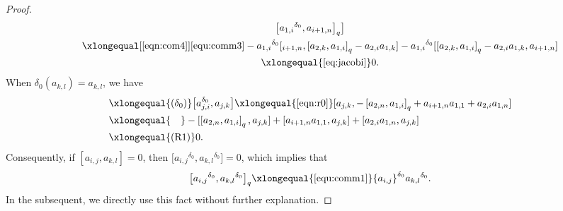 \documentclass[pdftex]{sigma}
\numberwithin{equation}{section}
\def\lr#1{\left[#1\right]}
\def\d{\delta}
\begin{document}
\begin{proof}
\begin{gather*}
 \bigl[{a_{1,i}}^{\d_0}, a_{i+1,n}\bigr]_q \bigr]\\
\qquad \xlongequal[\eqref{eqn:com4}]{\eqref{equ:comm3}} -{a_{1,i}}^{\d_0}[_{i+1, n}, \lr{a_{2, k}, a_{1, i}}_q-a_{2, i}a_{1, k} ]-{a_{1,i}}^{\d_0}[ \lr{a_{2, k}, a_{1, i}}_q-a_{2, i}a_{1, k} , a_{i+1,n}]\\
 \qquad\xlongequal{\eqref{eq:jacobi}} 0.
\end{gather*}
When $\d_0(a_{k,l})=a_{k,l}$, we have
\begin{align*}
[\d_0(a_{1,i}),\d_0(a_{j,k})]&\xlongequal{(\d_0)}\bigl[a_{j,i}^{\d_0}, a_{j,k}\bigr]\xlongequal{\eqref{eqn:r0}}[a_{j,k},-\lr{a_{2,n},a_{1,i}}_q+a_{i+1,n}a_{1,1}+a_{2,i}a_{1,n}]\\
&\xlongequal{\quad}-[\lr{a_{2,n}, a_{1,i}}_q, a_{j,k}]+\lr{a_{i+1,n}a_{1,1}, a_{j,k}}+\lr{a_{2,i}a_{1,n}, a_{j,k}}\\
 &\xlongequal{(\textrm{R1})}0.
 \end{align*}
Consequently, if $\lr{a_{i,j}, a_{k,l}}=0$, then $\bigl[{a_{i,j}}^{\d_0},{a_{k,l}}^{\d_0}\bigr]=0$, which implies that
\begin{equation*}
\bigl[{a_{i,j}}^{\d_0},{a_{k,l}}^{\d_0}\bigr]_q\xlongequal{\eqref{equ:comm1}} {a_{i,j}}^{\d_0}{a_{k,l}}^{\d_0}.
\end{equation*}
In the subsequent, we directly use this fact without further explanation.


\end{proof}
\end{document}
